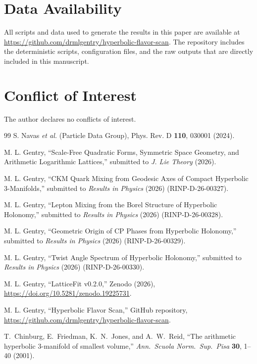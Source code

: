 ﻿\documentclass[12pt]{article}
\theoremstyle{definition}
\begin{document}
\section*{Data Availability}
All scripts and data used to generate the results in this paper are available at \url{https://github.com/drmlgentry/hyperbolic-flavor-scan}. The repository includes the deterministic scripts, configuration files, and the raw outputs that are directly included in this manuscript.

\section*{Conflict of Interest}
The author declares no conflicts of interest.

\begin{thebibliography}{99}
  S. Navas \textit{et al.} (Particle Data Group),
  Phys. Rev. D \textbf{110}, 030001 (2024).

  M. L. Gentry,
  ``Scale-Free Quadratic Forms, Symmetric Space Geometry, and Arithmetic Logarithmic Lattices,''
  submitted to \textit{J. Lie Theory} (2026).

  M. L. Gentry,
  ``CKM Quark Mixing from Geodesic Axes of Compact Hyperbolic 3-Manifolds,''
  submitted to \textit{Results in Physics} (2026) (RINP-D-26-00327).

  M. L. Gentry,
  ``Lepton Mixing from the Borel Structure of Hyperbolic Holonomy,''
  submitted to \textit{Results in Physics} (2026) (RINP-D-26-00328).

  M. L. Gentry,
  ``Geometric Origin of CP Phases from Hyperbolic Holonomy,''
  submitted to \textit{Results in Physics} (2026) (RINP-D-26-00329).

  M. L. Gentry,
  ``Twist Angle Spectrum of Hyperbolic Holonomy,''
  submitted to \textit{Results in Physics} (2026) (RINP-D-26-00330).

  M. L. Gentry,
  ``LatticeFit v0.2.0,''
  Zenodo (2026), \url{https://doi.org/10.5281/zenodo.19225731}.

  M. L. Gentry,
  ``Hyperbolic Flavor Scan,''
  GitHub repository, \url{https://github.com/drmlgentry/hyperbolic-flavor-scan}.

  T.~Chinburg, E.~Friedman, K.~N.~Jones, and A.~W.~Reid,
  ``The arithmetic hyperbolic 3-manifold of smallest volume,''
  \emph{Ann.\ Scuola Norm.\ Sup.\ Pisa} \textbf{30}, 1--40 (2001).


\end{thebibliography}
\end{document}

